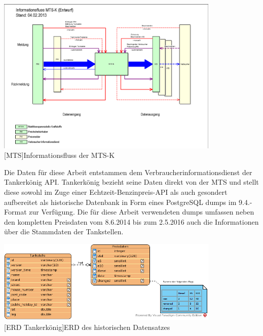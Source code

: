 \documentclass[12pt,a4paper,bibliography=totocnumbered,listof=totocnumbered]{scrartcl}
\begin{document}
\begin{center}
	\includegraphics[width=0.8\textwidth]{Bilder/Informationsfluss-MTS.png}\\
	[MTS]{Informationsfluss der MTS-K\cite{IMTSK}}
	\label{fig:MTS-K}
\end{center} 

Die Daten für diese Arbeit entstammen dem Verbraucherinformationsdienst der Tankerkönig API. Tankerkönig bezieht seine Daten direkt von der MTS  und stellt diese sowohl im Zuge einer Echtzeit-Benzinpreis-API als auch gesondert aufbereitet als historische Datenbank in Form eines PostgreSQL dumps im 9.4.-Format zur Verfügung. Die für diese Arbeit verwendeten dumps umfassen neben den kompletten Preisdaten vom 8.6.2014 bis zum 2.5.2016 auch die Informationen über die Stammdaten der Tankstellen.\cite{TkAPI} 

\begin{center}
	\includegraphics[width=0.8\textwidth]{Bilder/pricing_data.png}\\
	[ERD Tankerkönig]{ERD des historischen Datensatzes}
	\label{fig:ERD-T}
\end{center}

\end{document}
